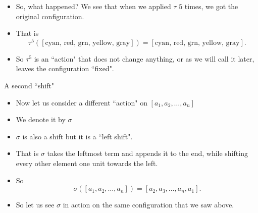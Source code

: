 \documentclass[ %
 10pt, xcolor={dvipsnames,svgnames,x11names,hyperref},
   hyperref={colorlinks=true,citecolor=green,linkcolor=DarkRed,urlcolor=ProcessBlue,anchorcolor=blue}
  ]{beamer}
\newenvironment{stepitemize}{\begin{itemize}[<+->]}{\end{itemize} }
\begin{document}
\begin{frame}
\begin{stepitemize}
    \item So, what happened? We see that when we applied $\tau$ $5$ times, we got the original configuration. 
    \item That is 
    $$\tau^5([\textrm{cyan, red, grn, yellow, gray}]) = [\textrm{cyan, red, grn, yellow, gray}].$$
    \item So $\tau^5$ is an ``action" that does not change anything, or as we will call it later, leaves the configuration ``fixed". 
\end{stepitemize}
\end{frame}

\begin{frame}{A second ``shift"}
\begin{stepitemize}
\item Now let us consider a different ``action" on $[a_1, a_2, \dots, a_n]$
\item We denote it by $\sigma$
\item $\sigma$ is also a shift but it is a ``left shift".
\item That is $\sigma$ takes the leftmost term and appends it to the end, while shifting every other element one unit towards the left.
\item So 
$$\sigma([a_1, a_2, \dots, a_n]) = [a_2, a_3, \dots, a_n, a_1]. $$
\item So let us see $\sigma$ in action on the same configuration that we saw above. 
\end{stepitemize}
\end{frame}
\end{document}
